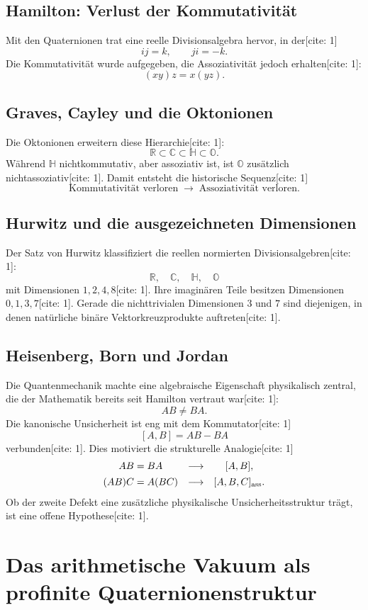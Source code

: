 \documentclass[11pt,a4paper]{article}
\newcommand{\OO}{\mathbb{O}}
\newcommand{\HH}{\mathbb{H}}
\newcommand{\RR}{\mathbb{R}}
\begin{document}
\subsection{Hamilton: Verlust der Kommutativität}
Mit den Quaternionen trat eine reelle Divisionsalgebra hervor, in der[cite: 1]
\[
ij=k,\qquad ji=-k.
\]
Die Kommutativität wurde aufgegeben, die Assoziativität jedoch erhalten[cite: 1]:
\[
(xy)z=x(yz).
\]

\subsection{Graves, Cayley und die Oktonionen}
Die Oktonionen erweitern diese Hierarchie[cite: 1]:
\[
\RR\subset\mathbb C\subset\HH\subset\OO.
\]
Während $\HH$ nichtkommutativ, aber assoziativ ist, ist $\OO$ zusätzlich nichtassoziativ[cite: 1]. Damit entsteht die historische Sequenz[cite: 1]
\[
\boxed{\text{Kommutativität verloren}\;\longrightarrow\;\text{Assoziativität verloren}.}
\]

\subsection{Hurwitz und die ausgezeichneten Dimensionen}
Der Satz von Hurwitz klassifiziert die reellen normierten Divisionsalgebren[cite: 1]:
\[
\RR,\quad\mathbb C,\quad\HH,\quad\OO
\]
mit Dimensionen $1,2,4,8$[cite: 1]. Ihre imaginären Teile besitzen Dimensionen $0,1,3,7$[cite: 1]. Gerade die nichttrivialen Dimensionen $3$ und $7$ sind diejenigen, in denen natürliche binäre Vektorkreuzprodukte auftreten[cite: 1].

\subsection{Heisenberg, Born und Jordan}
Die Quantenmechanik machte eine algebraische Eigenschaft physikalisch zentral, die der Mathematik bereits seit Hamilton vertraut war[cite: 1]:
\[
AB\neq BA.
\]
Die kanonische Unsicherheit ist eng mit dem Kommutator[cite: 1]
\[
[A,B]=AB-BA
\]
verbunden[cite: 1]. Dies motiviert die strukturelle Analogie[cite: 1]
\[
\begin{array}{ccc}
AB=BA &\longrightarrow& [A,B],\\[0.4em]
(AB)C=A(BC) &\longrightarrow& [A,B,C]_{\rm ass}.
\end{array}
\]
Ob der zweite Defekt eine zusätzliche physikalische Unsicherheitsstruktur trägt, ist eine offene Hypothese[cite: 1].

\section{Das arithmetische Vakuum als profinite Quaternionenstruktur}
\end{document}
